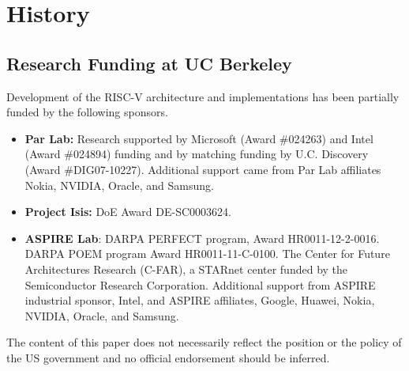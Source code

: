 \chapter{History}

\section{Research Funding at UC Berkeley}

Development of the RISC-V architecture and implementations has been
partially funded by the following sponsors.

\begin{itemize}
\item {\bf Par Lab:} Research supported by Microsoft (Award \#024263)
  and Intel (Award \#024894) funding and by matching funding by
  U.C. Discovery (Award \#DIG07-10227). Additional support came from
  Par Lab affiliates Nokia, NVIDIA, Oracle, and Samsung.

\item {\bf Project Isis:} DoE Award DE-SC0003624.

\item {\bf ASPIRE Lab}: DARPA PERFECT program, Award HR0011-12-2-0016.
  DARPA POEM program Award HR0011-11-C-0100.  The Center for Future
  Architectures Research (C-FAR), a STARnet center funded by the
  Semiconductor Research Corporation.  Additional support from ASPIRE
  industrial sponsor, Intel, and ASPIRE affiliates, Google, Huawei,
  Nokia, NVIDIA, Oracle, and Samsung.

\end{itemize}

The content of this paper does not necessarily reflect the position or the
policy of the US government and no official endorsement should be
inferred. 


